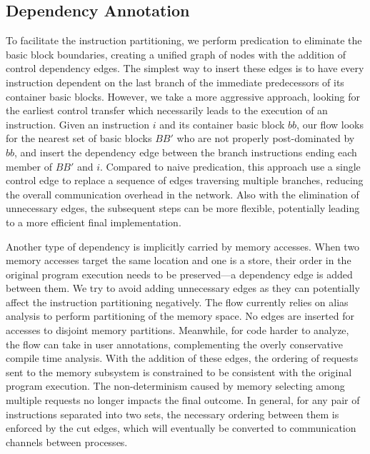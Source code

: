 \documentclass{sig-alternate}
\begin{document}
\subsection{Dependency Annotation}
\label{mainConvert:mem}
To facilitate the instruction partitioning, we perform predication to eliminate the basic block boundaries, creating a unified graph of nodes with the
addition of control dependency edges. 
The simplest way to insert these edges is to have every instruction dependent on the last branch of the immediate
predecessors of its container basic blocks. However, we take a more aggressive approach, looking for the earliest control transfer which necessarily leads to the execution of an instruction.
Given an instruction $i$ and its container basic block $bb$, our
flow looks for the nearest set of basic blocks $BB'$ who are not properly post-dominated by $bb$,
and insert the dependency edge between the branch instructions ending each member of $BB'$ and $i$. Compared to naive predication, this approach use a single control edge to replace a sequence of edges traversing multiple branches, reducing the overall communication
overhead in the network. Also with the elimination of unnecessary edges, the subsequent steps can be more flexible, potentially leading to a more efficient final implementation.

Another type of dependency is implicitly carried by memory accesses. When
two memory accesses target the same location and one
is a store, their order in the original program execution
needs to be preserved---a dependency edge is added
between them. We try to avoid adding unnecessary edges as they
can potentially affect the instruction partitioning negatively. 
The flow currently relies on alias analysis to perform partitioning of the memory space. No edges are inserted for accesses to disjoint memory partitions. 
Meanwhile, for code harder to analyze, the flow can take in user annotations, complementing the overly conservative compile time analysis. With the addition of these edges, the ordering of requests sent to the memory
subsystem is constrained to be consistent with the original program execution.
The non-determinism caused by memory selecting among multiple requests no longer
impacts the final outcome. In general, for any pair of instructions separated into two sets, the necessary ordering between them is enforced by the cut edges,
which will eventually be converted to communication channels between processes.
\end{document}
